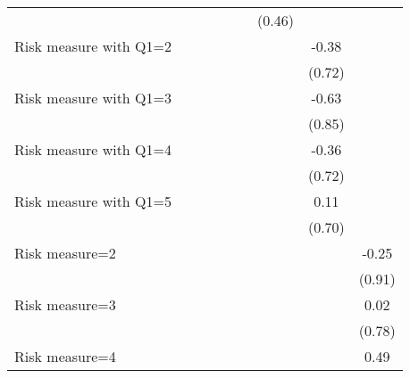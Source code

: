 \begin{table}[htbp]
\begin{threeparttable}
\begin{tabular}{l cccccccc}
                    &               &               &               &               &               &      (0.46)   &               &               \\
Risk measure with Q1=2&               &               &               &               &               &               &       -0.38   &               \\
                    &               &               &               &               &               &               &      (0.72)   &               \\
Risk measure with Q1=3&               &               &               &               &               &               &       -0.63   &               \\
                    &               &               &               &               &               &               &      (0.85)   &               \\
Risk measure with Q1=4&               &               &               &               &               &               &       -0.36   &               \\
                    &               &               &               &               &               &               &      (0.72)   &               \\
Risk measure with Q1=5&               &               &               &               &               &               &        0.11   &               \\
                    &               &               &               &               &               &               &      (0.70)   &               \\
Risk measure=2      &               &               &               &               &               &               &               &       -0.25   \\
                    &               &               &               &               &               &               &               &      (0.91)   \\
Risk measure=3      &               &               &               &               &               &               &               &        0.02   \\
                    &               &               &               &               &               &               &               &      (0.78)   \\
Risk measure=4      &               &               &               &               &               &               &               &        0.49   \\

\end{tabular}
\end{threeparttable}
\end{table}
